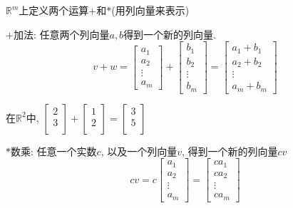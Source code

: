 $\mathbb{R}^{m}$上定义两个运算$+$和$*$(用列向量来表示)

\begin{definition}
    $+$加法: 
    任意两个列向量$a,b$得到一个新的列向量.
    \begin{equation}
      v+w=\begin{bmatrix} a_1 \\ a_2 \\ \vdots \\ a_m \end{bmatrix}+\begin{bmatrix} b_1 \\ b_2 \\ \vdots \\ b_m \end{bmatrix}
      =\begin{bmatrix} a_1+b_1 \\ a_2+b_2 \\ \vdots \\ a_m+b_m \end{bmatrix}
    \end{equation}
\end{definition}

\begin{example}
    在$\mathbb{R}^2$中, $\begin{bmatrix}
     2\\
     3\\
    \end{bmatrix}
    +
    \begin{bmatrix}
     1\\
     2\\
    \end{bmatrix}
    =
    \begin{bmatrix}
     3\\
     5\\
    \end{bmatrix}$
\end{example}

\begin{definition}
    $*$数乘:
    任意一个实数$c$, 以及一个列向量$v$, 得到一个新的列向量$cv$
    \begin{equation}
      cv=c\begin{bmatrix} a_1 \\ a_2 \\ \vdots \\ a_m \end{bmatrix}=\begin{bmatrix} ca_1 \\ ca_2 \\ \vdots \\ ca_m \end{bmatrix}
    \end{equation}
\end{definition}

